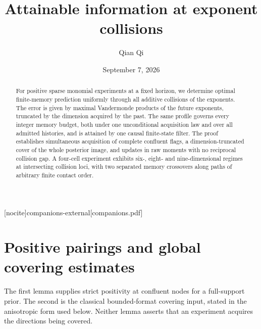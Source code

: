 
[nocite]{companions-external}[companions.pdf]
\title[Attainable information at exponent collisions]{Attainable information at exponent collisions}
\author{Qian Qi}
\date{September 7, 2026}

\begin{abstract}
For positive sparse monomial experiments at a fixed horizon, we determine
optimal finite-memory prediction uniformly through all additive
collisions of the exponents. The error is given by maximal Vandermonde
products of the future exponents, truncated by the dimension acquired
by the past. The same profile governs every integer memory budget,
both under one unconditional acquisition law and over all admitted
histories, and is attained by one causal finite-state filter.
The proof establishes simultaneous acquisition of complete confluent
flags, a dimension-truncated cover of the whole posterior image, and
updates in raw moments with no reciprocal collision gap. A
four-cell experiment exhibits six-, eight- and nine-dimensional
regimes at intersecting collision loci, with two separated memory
crossovers along paths of arbitrary finite contact order.
\end{abstract}
\maketitle






\section{Positive pairings and global covering estimates}\label{sec:analytic-inputs}
The first lemma supplies strict positivity at confluent nodes for a
full-support prior. The second is the classical bounded-format
covering input, stated in the anisotropic form used below. Neither
lemma asserts that an experiment acquires the directions being covered.


